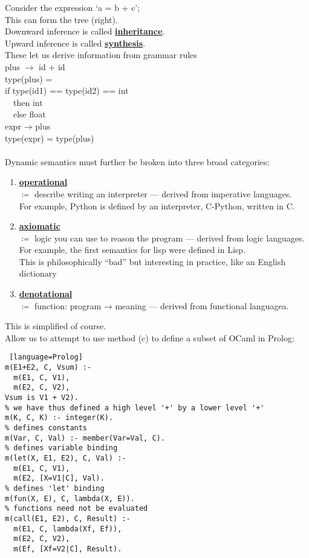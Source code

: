 \documentclass[../../lecture_notes.tex]{subfiles}
\begin{document}
Consider the expression ‘a = b + c’;\\
\indent This can form the tree (right).\\
Downward inference is called \textbf{\underline{inheritance}}.\\
Upward inference is called \textbf{\underline{synthesis}}.\\
These let us derive information from grammar rules\\
\indent plus $\rightarrow$ id + id\\
\indent \indent type(plus) = \\
\indent \indent \indent if type(id1) == type(id2) == int\\
\indent \indent \indent \ \ then int\\
\indent \indent \indent \ \ else float\\
\indent expr → plus\\
 \indent \indent type(expr) = type(plus)\\
\\ 
 Dynamic semantics must further be broken into three broad categories:
 \begin{enumerate} [itemsep=0mm]
	\item \textbf{\underline{operational}}\\
		$\coloneqq$ describe writing an interpreter — derived from imperative languages.\\
		For example, Python is defined by an interpreter, C-Python, written in C.
	\item \textbf{\underline{axiomatic}}\\
		$\coloneqq$ logic you can use to reason the program — derived from logic languages.\\
		For example, the first semantics for lisp were defined in Lisp.\\
		This is philosophically “bad” but interesting in practice, like an English dictionary
	\item \textbf{\underline{denotational}}\\
		$\coloneqq$ function: program → meaning — derived from functional languagea.
\end{enumerate}
\noindent This is simplified of course.
\\
Allow us to attempt to use method (c) to define a subset of OCaml in Prolog:\\
\begin{lstlisting} [language=Prolog]
m(E1+E2, C, Vsum) :-
  m(E1, C, V1),
  m(E2, C, V2),
Vsum is V1 + V2).
% we have thus defined a high level '+' by a lower level '+'
m(K, C, K) :- integer(K).
% defines constants
m(Var, C, Val) :- member(Var=Val, C).
% defines variable binding
m(let(X, E1, E2), C, Val) :-
  m(E1, C, V1),
  m(E2, [X=V1|C], Val).
% defines 'let' binding
m(fun(X, E), C, lambda(X, E)).
% functions need not be evaluated
m(call(E1, E2), C, Result) :-
  m(E1, C, lambda(Xf, Ef)),
  m(E2, C, V2),
  m(Ef, [Xf=V2|C], Result).
\end{lstlisting}
\end{document}
